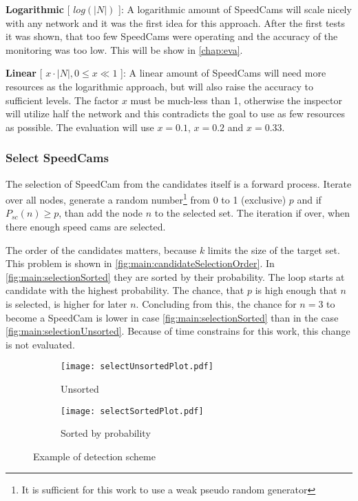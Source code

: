 \documentclass[thesis.tex]{subfiles}
\begin{document}
\textbf{Logarithmic} [ $log(|N|)$ ]: A logarithmic amount of SpeedCams will scale nicely with any network and it was the first idea for this approach. After the first tests it was shown, that too few SpeedCams were operating and the accuracy of the monitoring was too low. This will be show in \autoref{chap:eva}.

\textbf{Linear} [ $x\cdot |N|, 0 \leq x\ll1$ ]: A linear amount of SpeedCams will need more resources as the logarithmic approach, but will also raise the accuracy to sufficient levels. The factor $x$ must be much-less than 1, otherwise the inspector will utilize half the network and this contradicts the goal to use as few resources as possible. The evaluation will use $x=0.1$, $x=0.2$ and $x=0.33$.

\newpage
\subsubsection{Select SpeedCams}

The selection of SpeedCam from the candidates itself is a forward process. Iterate over all nodes, generate a random number\footnote{It is sufficient for this work to use a weak pseudo random generator} from 0 to 1 (exclusive) $p$ and if $P_{sc}(n) \geq p$, than add the node $n$ to the selected set. The iteration if over, when there enough speed cams are selected.

The order of the candidates matters, because $k$ limits the size of the target set. This problem is shown in \autoref{fig:main:candidateSelectionOrder}. In \autoref{fig:main:selectionSorted} they are sorted by their probability. The loop starts at candidate with the highest probability. The chance, that $p$ is high enough that $n$ is selected, is higher for later $n$. Concluding from this, the chance for $n=3$ to become a SpeedCam is lower in case \autoref{fig:main:selectionSorted} than in the case \autoref{fig:main:selectionUnsorted}. Because of time constrains for this work, this change is not evaluated. 
\begin{figure}[h]
    \begin{subfigure}{.45\linewidth}
        \centering
        \texttt{[image: selectUnsortedPlot.pdf]}
        \caption{Unsorted}
        \label{fig:main:selectionUnsorted}
    \end{subfigure}%
    \begin{subfigure}{0.45\linewidth}
        \centering
        \texttt{[image: selectSortedPlot.pdf]}
        \caption{Sorted by probability}
        \label{fig:main:selectionSorted}
    \end{subfigure}
    \caption{Example of detection scheme}
    \label{fig:main:candidateSelectionOrder}
\end{figure}
\end{document}
